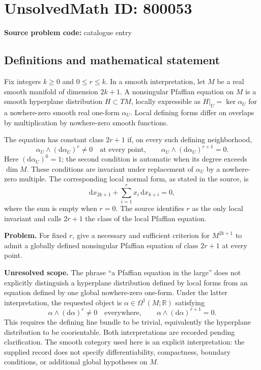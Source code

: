 \documentclass[11pt]{article}
\newcommand{\R}{\mathbb{R}}
\begin{document}
\section*{UnsolvedMath ID: 800053}
\textbf{Source problem code:} catalogue entry
\subsection{Definitions and mathematical statement}
Fix integers \(k\geq 0\) and \(0\leq r\leq k\). In a smooth interpretation, let \(M\) be a real smooth manifold of dimension \(2k+1\). A nonsingular Pfaffian equation on \(M\) is a smooth hyperplane distribution \(H\subset TM\), locally expressible as \(H|_U=\ker\alpha_U\) for a nowhere-zero smooth real one-form \(\alpha_U\). Local defining forms differ on overlaps by multiplication by nowhere-zero smooth functions.

The equation has constant class \(2r+1\) if, on every such defining neighborhood,
\[
\alpha_U\wedge(\mathrm d\alpha_U)^r\neq 0
\quad\text{at every point},\qquad
\alpha_U\wedge(\mathrm d\alpha_U)^{r+1}=0.
\]
Here \((\mathrm d\alpha_U)^0=1\); the second condition is automatic when its degree exceeds \(\dim M\). These conditions are invariant under replacement of \(\alpha_U\) by a nowhere-zero multiple. The corresponding local normal form, as stated in the source, is
\[
\mathrm d x_{2k+1}+\sum_{i=1}^{r}x_i\,\mathrm d x_{k+i}=0,
\]
where the sum is empty when \(r=0\). The source identifies \(r\) as the only local invariant and calls \(2r+1\) the class of the local Pfaffian equation.

\textbf{Problem.} For fixed \(r\), give a necessary and sufficient criterion for \(M^{2k+1}\) to admit a globally defined nonsingular Pfaffian equation of class \(2r+1\) at every point.

\textbf{Unresolved scope.} The phrase ``a Pfaffian equation in the large'' does not explicitly distinguish a hyperplane distribution defined by local forms from an equation defined by one global nowhere-zero one-form. Under the latter interpretation, the requested object is \(\alpha\in\Omega^1(M;\R)\) satisfying
\[
\alpha\wedge(\mathrm d\alpha)^r\neq 0
\quad\text{everywhere},\qquad
\alpha\wedge(\mathrm d\alpha)^{r+1}=0.
\]
This requires the defining line bundle to be trivial, equivalently the hyperplane distribution to be coorientable. Both interpretations are recorded pending clarification. The smooth category used here is an explicit interpretation: the supplied record does not specify differentiability, compactness, boundary conditions, or additional global hypotheses on \(M\).
\end{document}
